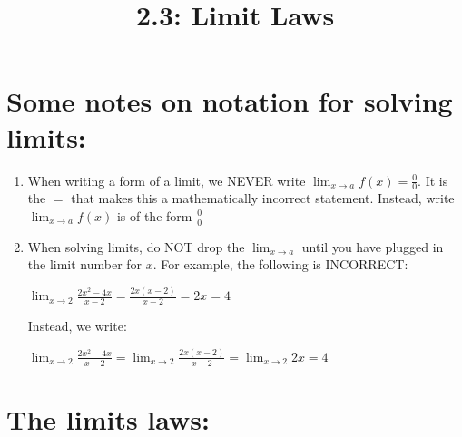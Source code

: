 \documentclass[nooutcomes]{ximera}
\title{2.3:  Limit Laws}
\begin{document}
\begin{abstract}		\end{abstract}
\maketitle

\section{Some notes on notation for solving limits:}
\begin{enumerate}
	\item When writing a form of a limit, we NEVER write $\lim_{x \to a}f(x)=\frac{0}{0}$.  It is the $=$ that makes this a mathematically incorrect statement.  Instead, write $\lim_{x \to a}f(x)$ is of the form $\frac{0}{0}$

	\item When solving limits, do NOT drop the $\lim_{x \to a}$ until you have plugged in the limit number for $x$.  For example, the following is INCORRECT:
	\begin{center}
	$\lim_{x \to 2}\frac{2x^2-4x}{x-2}=\frac{2x(x-2)}{x-2}=2x=4$\\	
	\end{center}

	Instead, we write: 
		\begin{center}
	$\lim_{x \to 2}\frac{2x^2-4x}{x-2}=\lim_{x \to 2}\frac{2x(x-2)}{x-2}=\lim_{x \to 2}2x=4$\\	
	\end{center}

\end{enumerate}

 \section{The limits laws:}
  
\end{document}
